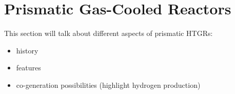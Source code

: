 \section{Prismatic Gas-Cooled Reactors}

This section will talk about different aspects of prismatic HTGRs:

\begin{itemize}
	\item history
	\item features
	\item co-generation possibilities (highlight hydrogen production)
\end{itemize}
